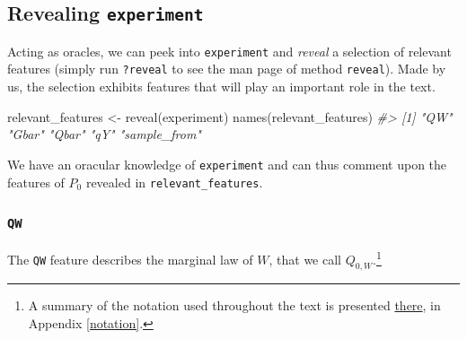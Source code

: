 \documentclass[
  11pt,
  openright,twoside]{book}
\newenvironment{Shaded}{\begin{snugshade}}{\end{snugshade}}
\newcommand{\CommentTok}[1]{\textcolor[rgb]{0.56,0.35,0.01}{\textit{#1}}}
\newcommand{\FunctionTok}[1]{\textcolor[rgb]{0.00,0.00,0.00}{#1}}
\newcommand{\NormalTok}[1]{#1}
\newcommand{\OtherTok}[1]{\textcolor[rgb]{0.56,0.35,0.01}{#1}}
\newcommand{\SpecialCharTok}[1]{\textcolor[rgb]{0.00,0.00,0.00}{#1}}
\theoremstyle{definition}
\theoremstyle{definition}
\theoremstyle{definition}
\theoremstyle{definition}
\theoremstyle{remark}
\begin{document}
\hypertarget{revealing-experiment}{%
\subsection{\texorpdfstring{Revealing \texttt{experiment}}{Revealing experiment}}\label{revealing-experiment}}

Acting as oracles, we can peek into \texttt{experiment} and \emph{reveal} a selection of
relevant features (simply run \texttt{?reveal} to see the man page of method
\texttt{reveal}). Made by us, the selection exhibits features that will play an
important role in the text.

\begin{Shaded}
\begin{Highlighting}[]
\NormalTok{relevant\_features }\OtherTok{\textless{}{-}} \FunctionTok{reveal}\NormalTok{(experiment)}
\FunctionTok{names}\NormalTok{(relevant\_features)}
\CommentTok{\#\textgreater{} [1] "QW"          "Gbar"        "Qbar"        "qY"          "sample\_from"}
\end{Highlighting}
\end{Shaded}

We have an oracular knowledge of \texttt{experiment} and can thus comment upon the
features of \(P_{0}\) revealed in \texttt{relevant\_features}.

\hypertarget{qw}{%
\subsubsection*{\texorpdfstring{\texttt{QW}}{QW}}\label{qw}}

The \texttt{QW} feature describes the marginal law of \(W\), that we call \(Q_{0,W}\).\footnote{A
  summary of the notation used throughout the text is presented
  \protect\hyperlink{notation}{there}, in Appendix \ref{notation}.}

\begin{Shaded}
\end{Shaded}
\end{document}
